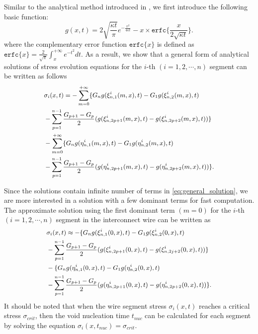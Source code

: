 Similar to the analytical method introduced in
\cite{ChenHuang:DAC'15}, we first introduce the following basic
function:
\begin{equation} \label{general_basisFunc}
g(x,t)=2\sqrt{\frac{\kappa t}{\pi}}e^{-\frac{x^2}{4\kappa
t}}-x\times\texttt{erfc}\{\frac{x}{2\sqrt{\kappa t}}\}.
\end{equation}
where the complementary error function $\texttt{erfc}\{x\}$ is defined
as
$\texttt{erfc}\{x\}=\frac{2}{\sqrt{\pi}}\int_x^{+\infty}e^{-t^2}dt$.
As a result, we show that a general form of analytical solutions of stress evolution
equations for the $i$-th $(i=1,2,\cdots,n)$ segment can be written as follows
\begin{equation} \label{eq:general_solution}\small
\begin{split}
&\sigma_{i}(x,t)=-\sum\limits_{m=0}^{+\infty}\{G_ng(\xi_{n,1}^{i}(m,x),t)-G_1g(\xi_{n,2}^{i}(m,x),t)\\
&-\sum\limits_{p=1}^{n-1}\frac{G_{p+1}-G_p}{2}(g(\xi_{n,2p+1}^{i}(m,x),t)-g(\xi_{n,2p+2}^{i}(m,x),t))\}\\
&-\sum\limits_{m=0}^{+\infty}\{G_ng(\eta_{n,1}^{i}(m,x),t)-G_1g(\eta_{n,2}^{i}(m,x),t)\\
&-\sum\limits_{p=1}^{n-1}\frac{G_{p+1}-G_p}{2}(g(\eta_{n,2p+1}^{i}(m,x),t)-g(\eta_{n,2p+2}^{i}(m,x),t))\}.
 \end{split}
 \end{equation}

 Since the solutions contain infinite number of terms in
 \eqref{eq:general_solution}, we are more interested in a solution
 with a few dominant terms for fast computation. The approximate
 solution using the first dominant term $(m=0)$ for the $i$-th $(i=1,2,\cdots,n)$ segment in the
 interconnect wire can be written as
\begin{equation} \label{eq:approximate_solution}\small
\begin{split}
&\sigma_{i}(x,t)\approx-\{G_ng(\xi_{n,1}^{i}(0,x),t)-G_1g(\xi_{n,2}^{i}(0,x),t)\\
&-\sum\limits_{p=1}^{n-1}\frac{G_{p+1}-G_p}{2}(g(\xi_{n,2p+1}^{i}(0,x),t)-g(\xi_{n,2j+2}^{i}(0,x),t))\}\\
&-\{G_ng(\eta_{n,1}^{i}(0,x),t)-G_1g(\eta_{n,2}^{i}(0,x),t)\\
&-\sum\limits_{p=1}^{n-1}\frac{G_{p+1}-G_p}{2}(g(\eta_{n,2p+1}^{i}(0,x),t)-g(\eta_{n,2p+2}^{i}(0,x),t))\}.
 \end{split}
 \end{equation}
It should be noted that when the wire segment stress $\sigma_{i}(x,t)$ reaches 
a critical stress $\sigma_{crit}$, then the void nucleation time $t_{nuc}$ can be calculated for each segment by
solving the equation $\sigma_{i}(x,t_{nuc})=\sigma_{crit}$.
 
